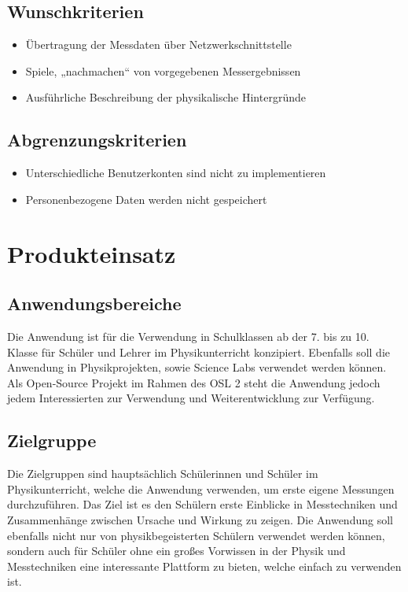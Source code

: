 \documentclass[parskip=full]{scrartcl}
\begin{document}
\subsection{Wunschkriterien}

\begin{itemize}

\item Übertragung der Messdaten über Netzwerkschnittstelle
\item Spiele, „nachmachen“ von vorgegebenen Messergebnissen
\item Ausführliche Beschreibung der physikalische Hintergründe

 \end{itemize}

\subsection{Abgrenzungskriterien}

\begin{itemize}

\item Unterschiedliche Benutzerkonten sind nicht zu implementieren
\item Personenbezogene Daten werden nicht gespeichert

 \end{itemize}

\section{Produkteinsatz}

\subsection{Anwendungsbereiche}

Die Anwendung ist für die Verwendung in Schulklassen ab der 7. bis zu 10. Klasse für Schüler und Lehrer im Physikunterricht konzipiert. Ebenfalls soll die Anwendung in Physikprojekten, sowie \gls{Science Labs} verwendet werden können. 
Als \gls{Open-Source Projekt} im Rahmen des \gls{OSL 2} steht die Anwendung jedoch jedem Interessierten zur Verwendung und Weiterentwicklung zur Verfügung.


\subsection{Zielgruppe}

Die Zielgruppen sind hauptsächlich Schülerinnen und Schüler im Physikunterricht, welche die Anwendung verwenden, um erste eigene Messungen durchzuführen. Das Ziel ist es den Schülern erste Einblicke in Messtechniken und Zusammenhänge zwischen Ursache und Wirkung zu zeigen. 
Die Anwendung soll ebenfalls nicht nur von physikbegeisterten Schülern verwendet werden können, sondern auch für Schüler ohne ein großes Vorwissen in der Physik und Messtechniken eine interessante Plattform zu bieten, welche einfach zu verwenden ist.
\end{document}
